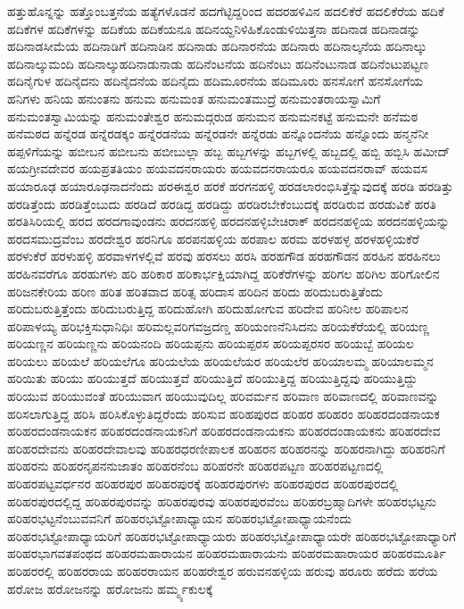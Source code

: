{ಹತ್ತುಹೊನ್ನನ್ನು
ಹತ್ತೊಂಬತ್ತನೆಯ
ಹತ್ಯೆಗಳೊಡನೆ
ಹದಗೆಟ್ಟಿದ್ದರಿಂದ
ಹದರಹಳಿವಿನ
ಹದಲಿಕೆರೆ
ಹದಲಿಕೆರೆಯ
ಹದಿಕೆ
ಹದಿಕೆಗಳ
ಹದಿಕೆಗಳನ್ನು
ಹದಿಕೆಯ
ಹದಿಕೆಯನೂ
ಹದಿನಯ್ದನಿಳಿಹಿಕೊಂಡುಳಿಯಿತ್ತನಾ
ಹದಿನಾಡ
ಹದಿನಾಡನ್ನು
ಹದಿನಾಡಸೀಮೆಯ
ಹದಿನಾಡಿಗೆ
ಹದಿನಾಡಿನ
ಹದಿನಾಡು
ಹದಿನಾರನೆಯ
ಹದಿನಾರು
ಹದಿನಾಲ್ಕನೆಯ
ಹದಿನಾಲ್ಕು
ಹದಿನಾಲ್ಕುಮಂದಿ
ಹದಿನಾಲ್ಕುಹದಿನಾಡುನಾಡು
ಹದಿನೆಂಟನೆಯ
ಹದಿನೆಂಟು
ಹದಿನೆಂಟುನಾಡ
ಹದಿನೆಂಟುಪಟ್ಟಣ
ಹದಿನೈಗುಳ
ಹದಿನೈದನು
ಹದಿನೈದನೆಯ
ಹದಿನೈದು
ಹದಿಮೂರನೆಯ
ಹದಿಮೂರು
ಹನಸೋಗೆ
ಹನಸೋಗೆಯ
ಹನಿಗಳು
ಹನಿಯ
ಹನುಂತನು
ಹನುಮ
ಹನುಮಂತ
ಹನುಮಂತಮುದ್ರೆ
ಹನುಮಂತರಾಯಸ್ವಾಮಿಗೆ
ಹನುಮಂತಸ್ವಾಮಿಯನ್ನು
ಹನುಮಂತೇಶ್ವರ
ಹನುಮದ್ಗರುಡ
ಹನುಮನ
ಹನುಮನಕಟ್ಟೆ
ಹನುಮನೇ
ಹನೆಮಠ
ಹನೆಮಠದ
ಹನ್ನೆರಡ
ಹನ್ನೆರಡಕ್ಕಂ
ಹನ್ನೆರಡನೆಯ
ಹನ್ನೆರಡನೇ
ಹನ್ನೆರಡು
ಹನ್ನೊಂದನೆಯ
ಹನ್ನೊಂದು
ಹನ್ಮನೆನೀ
ಹಪ್ಪಳಿಗೆಯನ್ನು
ಹಬೀಬನ
ಹಬೀಬನು
ಹಬೀಬುಲ್ಲಾ
ಹಬ್ಬ
ಹಬ್ಬಗಳನ್ನು
ಹಬ್ಬಗಳಲ್ಲಿ
ಹಬ್ಬದಲ್ಲಿ
ಹಬ್ಬಿ
ಹಬ್ಬಿಸಿ
ಹಮೀದ್
ಹಯಗ್ರೀವದೇವರ
ಹಯಪ್ರತತಿಯಂ
ಹಯವದನರಾಯರು
ಹಯವದನರಾಯರೂ
ಹಯವದನರಾವ್
ಹಯವಸ
ಹಯಾರೂಢ
ಹಯಾರೂಢನಾದನೆಂದು
ಹರಈಶ್ವರ
ಹರಕೆ
ಹರಗನಹಳ್ಳಿ
ಹರಡಲಾರಂಭಿಸಿತ್ತೆನ್ನುವುದಕ್ಕೆ
ಹರಡಿ
ಹರಡಿತ್ತು
ಹರಡಿತ್ತೆಂದು
ಹರಡಿತ್ತೆಂಬುದು
ಹರಡಿದೆ
ಹರಡಿದ್ದ
ಹರಡಿದ್ದು
ಹರಡಿರಬೇಕೆಂಬುದಕ್ಕೆ
ಹರಡಿರುವ
ಹರಡುವಿಕೆ
ಹರತಿ
ಹರತಿಸಿರಿಯಲ್ಲಿ
ಹರದ
ಹರದಗಾವುಂಡನು
ಹರದನಹಳ್ಳಿ
ಹರದನಹಳ್ಳಿಬೇಚಿರಾಕ್
ಹರದನಹಳ್ಳಿಯ
ಹರದನಹಳ್ಳಿಯನ್ನು
ಹರದಸಮುದ್ರವೆಂಬ
ಹರದೇಶ್ವರ
ಹರನಿಗೂ
ಹರಪನಹಳ್ಳಿಯ
ಹರಪಾಲ
ಹರಮ
ಹರಳಹಳ್ಳ
ಹರಳಹಳ್ಳಿಯಕೆರೆ
ಹರಳುಕೆರೆ
ಹರಳುಹಳ್ಳಿ
ಹರವಾಳಗಳಲ್ಲಿವೆ
ಹರವು
ಹರಸಲು
ಹರಸಿ
ಹರಹಗೌಡ
ಹರಹಗೌಡನ
ಹರಹಿನ
ಹರಹಿನಲು
ಹರಹಿನವರೆಗೂ
ಹರಹುಗಳು
ಹರಿ
ಹರಿಕಾರ
ಹರಿಕಾರ್ಭಕ್ಷಿಯಾಗಿದ್ದ
ಹರಿಕೆರೆಗಳನ್ನು
ಹರಿಗಲ
ಹರಿಗಿಲ
ಹರಿಗೋಲಿನ
ಹರಿಜನಕೇರಿಯ
ಹರಿಣ
ಹರಿತ
ಹರಿತವಾದ
ಹರಿತ್ಸ
ಹರಿದಾಸ
ಹರಿದಿನ
ಹರಿದು
ಹರಿದುಬರುತ್ತಿತೆಂದು
ಹರಿದುಬರುತ್ತಿತ್ತೆಂದು
ಹರಿದುಬರುತ್ತಿದ್ದ
ಹರಿದುಹೋಗಿ
ಹರಿದುಹೋಗುವ
ಹರಿದೇವ
ಹರಿನೀಲ
ಹರಿಪಾಲನ
ಹರಿಪಾಳಯ್ಯ
ಹರಿಭಕ್ತಿಸುಧಾನಿಧಿಃ
ಹರಿಮಲ್ಲವರಿಗವಜ್ರದಣ್ಡ
ಹರಿಯಂಣನೆನಿಸಿದನು
ಹರಿಯಕೆರೆಯಲ್ಲಿ
ಹರಿಯಣ್ಣ
ಹರಿಯಣ್ಣನ
ಹರಿಯಣ್ಣನು
ಹರಿಯನಂದಿ
ಹರಿಯಪ್ಪನು
ಹರಿಯಪ್ಪರಸ
ಹರಿಯಪ್ಪರಸರ
ಹರಿಯಬ್ಬೆ
ಹರಿಯಲ
ಹರಿಯಲು
ಹರಿಯಲೆ
ಹರಿಯಲೆಗೂ
ಹರಿಯಲೆಯ
ಹರಿಯಲೆಯರ
ಹರಿಯಲೆರ
ಹರಿಯಾಲಮ್ಮ
ಹರಿಯಾಲಮ್ಮನ
ಹರಿಯಿತು
ಹರಿಯು
ಹರಿಯುತ್ತದೆ
ಹರಿಯುತ್ತವೆ
ಹರಿಯುತ್ತಿದೆ
ಹರಿಯುತ್ತಿದ್ದ
ಹರಿಯುತ್ತಿದ್ದವು
ಹರಿಯುತ್ತಿದ್ದು
ಹರಿಯುವ
ಹರಿಯುವಂತೆ
ಹರಿಯುವಾಗ
ಹರಿಯುವುದಿಲ್ಲ
ಹರಿವರ್ಮನ
ಹರಿವಾಣ
ಹರಿವಾಣದಲ್ಲಿ
ಹರಿವಾಣವನ್ನು
ಹರಿಸಲಾಗುತ್ತಿದ್ದ
ಹರಿಸಿ
ಹರಿಸಿಕೊಳ್ಳುತಿದ್ದರೆಂದು
ಹರಿಸುವ
ಹರಿಹಪುರದ
ಹರಿಹರ
ಹರಿಹರಂ
ಹರಿಹರದಂಡನಾಯಕ
ಹರಿಹರದಂಡನಾಯಕನ
ಹರಿಹರದಂಡನಾಯಕನಿಗೆ
ಹರಿಹರದಂಡನಾಯಕನು
ಹರಿಹರದಂಡಾಯಕನು
ಹರಿಹರದೇವ
ಹರಿಹರದೇವನು
ಹರಿಹರದೇವಾಲವು
ಹರಿಹರಧರಣೀಪಾಲಕ
ಹರಿಹರನ
ಹರಿಹರನನ್ನು
ಹರಿಹರನಾಗಿದ್ದು
ಹರಿಹರನಿಗೆ
ಹರಿಹರನು
ಹರಿಹರನೃಪನನುಜಾತಂ
ಹರಿಹರನೆಂಬ
ಹರಿಹರನೇ
ಹರಿಹರಪಟ್ಟಣ
ಹರಿಹರಪಟ್ಟಣದಲ್ಲಿ
ಹರಿಹರಪಟ್ಟವರ್ಧನರ
ಹರಿಹರಪುರ
ಹರಿಹರಪುರಕ್ಕೆ
ಹರಿಹರಪುರಗಳು
ಹರಿಹರಪುರದ
ಹರಿಹರಪುರದಲ್ಲಿ
ಹರಿಹರಪುರದಲ್ಲಿದ್ದ
ಹರಿಹರಪುರವನ್ನು
ಹರಿಹರಪುರವು
ಹರಿಹರಪುರವೆಂಬ
ಹರಿಹರಬ್ರಹ್ಮಾದಿಗಳೇ
ಹರಿಹರಭಟ್ಟನು
ಹರಿಹರಭಟ್ಟನೆಂಬುವವನಿಗೆ
ಹರಿಹರಭಟ್ಟೋಪಾಧ್ಯಾಯನ
ಹರಿಹರಭಟ್ಟೋಪಾಧ್ಯಾಯನೆಂದು
ಹರಿಹರಭಟ್ಟೋಪಾಧ್ಯಾಯರಿಗೆ
ಹರಿಹರಭಟ್ಟೋಪಾಧ್ಯಾಯರು
ಹರಿಹರಭಟ್ಟೋಪಾಧ್ಯಾಯರೇ
ಹರಿಹರಭಟ್ಟೋಪಾಧ್ಯಾರಿಗೆ
ಹರಿಹರಭಾಗವತಪಂಥದ
ಹರಿಹರಮಹಾರಾಯನ
ಹರಿಹರಮಹಾರಾಯನು
ಹರಿಹರಮಹಾರಾಯರ
ಹರಿಹರಮೂರ್ತಿ
ಹರಿಹರರಲ್ಲಿ
ಹರಿಹರರಾಯ
ಹರಿಹರರಾಯನ
ಹರಿಹರೇಶ್ವರ
ಹರುವನಹಳ್ಳಿಯ
ಹರುವು
ಹರೂರು
ಹರೆದು
ಹರೆಯ
ಹರೋಜ
ಹರೋಜನನ್ನು
ಹರೋಜನು
ಹರ್ಮ್ಮ್ಯಕುಲಕ್ಕೆ
}
